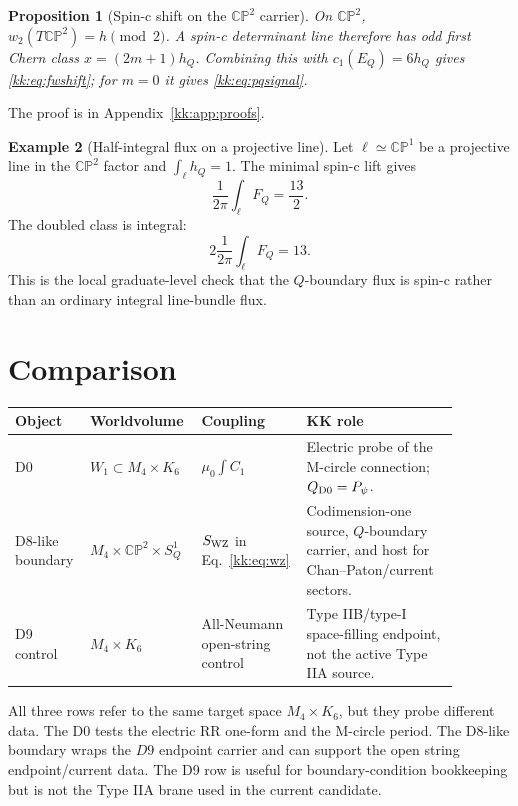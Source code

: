 \documentclass[11pt]{article}
\newcommand{\CP}{\mathbb{CP}}
\theoremstyle{plain}
\newtheorem{proposition}{Proposition}[section]
\theoremstyle{definition}
\newtheorem{example}[proposition]{Example}
\begin{document}
\begin{proposition}[Spin-c shift on the \(\CP^2\) carrier]
\label{kk:prop:spinc}
On \(\CP^2\), \(w_2(T\CP^2)=h\pmod 2\).  A spin-c determinant line therefore
has odd first Chern class \(x=(2m+1)h_Q\).  Combining this with
\(c_1(E_Q)=6h_Q\) gives \eqref{kk:eq:fwshift}; for \(m=0\) it gives
\eqref{kk:eq:pqsignal}.
\end{proposition}
The proof is in Appendix~\ref{kk:app:proofs}.

\begin{example}[Half-integral flux on a projective line]
\label{kk:ex:half-flux}
Let \(\ell\simeq\CP^1\) be a projective line in the \(\CP^2\) factor and
\(\int_\ell h_Q=1\).  The minimal spin-c lift gives
\[
  \frac{1}{2\pi}\int_\ell F_Q=\frac{13}{2}.
\]
The doubled class is integral:
\[
  2\frac{1}{2\pi}\int_\ell F_Q=13 .
\]
This is the local graduate-level check that the \(Q\)-boundary flux is
spin-c rather than an ordinary integral line-bundle flux.
\end{example}

\section{Comparison}
\label{kk:sec:comparison}

\begin{center}
\small
\begin{tabular}{@{}>{\raggedright\arraybackslash}p{0.15\linewidth}
>{\raggedright\arraybackslash}p{0.23\linewidth}
>{\raggedright\arraybackslash}p{0.17\linewidth}
>{\raggedright\arraybackslash}p{0.33\linewidth}@{}}
\hline
Object & Worldvolume & Coupling & KK role\\
\hline
D0 & \(W_1\subset M_4\times K_6\) &
\(\mu_0\int C_1\) &
Electric probe of the M-circle connection; \(Q_{\rm D0}=P_\psi\).\\
D8-like boundary &
\(M_4\times\CP^2\times S^1_Q\) &
\(S_{\rm WZ}\) in Eq.~\eqref{kk:eq:wz} &
Codimension-one source, \(Q\)-boundary carrier, and host for Chan--Paton/current sectors.\\
D9 control &
\(M_4\times K_6\) &
All-Neumann open-string control &
Type IIB/type-I space-filling endpoint, not the active Type IIA source.\\
\hline
\end{tabular}
\end{center}

All three rows refer to the same target space \(M_4\times K_6\), but they probe
different data.  The D0 tests the electric RR one-form and the M-circle period.
The D8-like boundary wraps the \(D9\) endpoint carrier and can support the open
string endpoint/current data.  The D9 row is useful for boundary-condition
bookkeeping but is not the Type IIA brane used in the current candidate.
\end{document}
